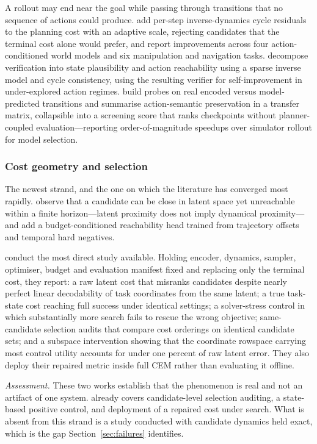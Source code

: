 \documentclass[11pt,letterpaper]{article}
\begin{document}
A rollout may end near the goal while passing through transitions that no
sequence of actions could produce. \citet{acid2026} add per-step inverse-dynamics
cycle residuals to the planning cost with an adaptive scale, rejecting
candidates that the terminal cost alone would prefer, and report improvements
across four action-conditioned world models and six manipulation and navigation
tasks. \citet{liu2026wav} decompose verification into state plausibility and
action reachability using a sparse inverse model and cycle consistency, using
the resulting verifier for self-improvement in under-explored action regimes.
\citet{chen2026atm} build probes on real encoded versus model-predicted
transitions and summarise action-semantic preservation in a transfer matrix,
collapsible into a screening score that ranks checkpoints without planner-coupled
evaluation---reporting order-of-magnitude speedups over simulator rollout for
model selection.

\subsubsection{Cost geometry and selection}\label{sec:lit-diag-cost}

The newest strand, and the one on which the literature has converged most
rapidly. \citet{rcaux2026} observe that a candidate can be close in latent space
yet unreachable within a finite horizon---latent proximity does not imply
dynamical proximity---and add a budget-conditioned reachability head trained from
trajectory offsets and temporal hard negatives.

\citet{trm2026} conduct the most direct study available. Holding encoder,
dynamics, sampler, optimiser, budget and evaluation manifest fixed and replacing
only the terminal cost, they report: a raw latent cost that misranks candidates
despite nearly perfect linear decodability of task coordinates from the same
latent; a true task-state cost reaching full success under identical settings; a
solver-stress control in which substantially more search fails to rescue the
wrong objective; same-candidate selection audits that compare cost orderings on
identical candidate sets; and a subspace intervention showing that the
coordinate rowspace carrying most control utility accounts for under one percent
of raw latent error. They also deploy their repaired metric inside full CEM
rather than evaluating it offline.

\emph{Assessment.} These two works establish that the phenomenon is real and not
an artifact of one system. \citet{trm2026} already covers candidate-level
selection auditing, a state-based positive control, and deployment of a
repaired cost under search. What is absent from this strand is a study
conducted with candidate dynamics held exact, which is the gap
Section~\ref{sec:failures} identifies.
\end{document}
